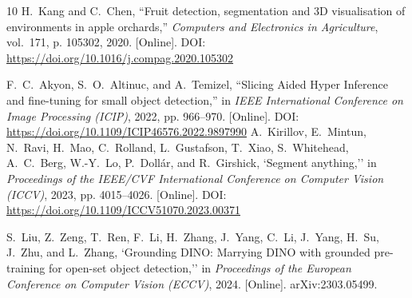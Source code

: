 \documentclass[12pt,a4paper]{article}
\begin{document}
\begin{thebibliography}{10}
H.~Kang and C.~Chen, ``Fruit detection, segmentation and 3D visualisation of environments in apple orchards,'' \textit{Computers and Electronics in Agriculture}, vol.~171, p. 105302, 2020. [Online]. DOI: \url{https://doi.org/10.1016/j.compag.2020.105302}

F.~C.~Akyon, S.~O.~Altinuc, and A.~Temizel, ``Slicing Aided Hyper Inference and fine-tuning for small object detection,'' in \textit{IEEE International Conference on Image Processing (ICIP)}, 2022, pp. 966--970. [Online]. DOI: \url{https://doi.org/10.1109/ICIP46576.2022.9897990}
A.~Kirillov, E.~Mintun, N.~Ravi, H.~Mao, C.~Rolland, L.~Gustafson, T.~Xiao, S.~Whitehead, A.~C.~Berg, W.-Y.~Lo, P.~Doll{\'a}r, and R.~Girshick, `Segment anything,'' in \textit{Proceedings of the IEEE/CVF International Conference on Computer Vision (ICCV)}, 2023, pp. 4015--4026. [Online]. DOI: \url{https://doi.org/10.1109/ICCV51070.2023.00371}

S.~Liu, Z.~Zeng, T.~Ren, F.~Li, H.~Zhang, J.~Yang, C.~Li, J.~Yang, H.~Su, J.~Zhu, and L.~Zhang, `Grounding DINO: Marrying DINO with grounded pre-training for open-set object detection,'' in \textit{Proceedings of the European Conference on Computer Vision (ECCV)}, 2024. [Online]. arXiv:2303.05499.

\end{thebibliography}
\end{document}
